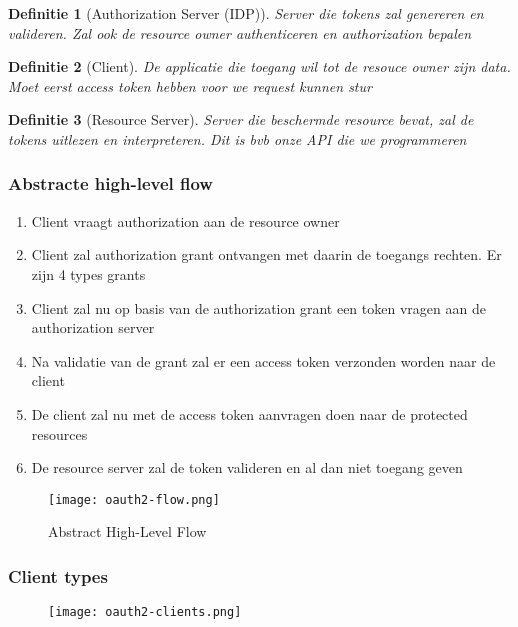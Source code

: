 \documentclass{article}
\newtheorem{theorem}{Definitie}[section]
\begin{document}
\begin{theorem}[Authorization Server (IDP)]
    Server die tokens zal genereren en valideren. Zal ook de resource owner authenticeren en authorization bepalen
\end{theorem}

\begin{theorem}[Client]
    De applicatie die toegang wil tot de resouce owner zijn data. Moet eerst access token hebben voor we request kunnen stur
\end{theorem}

\begin{theorem}[Resource Server]
    Server die beschermde resource bevat, zal de tokens uitlezen en interpreteren. Dit is bvb onze API die we programmeren
\end{theorem}

\subsubsection{Abstracte high-level flow}

\begin{enumerate}
    \item Client vraagt authorization aan de resource owner
    \item Client zal authorization grant ontvangen met daarin de toegangs rechten. Er zijn 4 types grants
    \item Client zal nu op basis van de authorization grant een token vragen aan de authorization server
    \item Na validatie van de grant zal er een access token verzonden worden naar de client
    \item De client zal nu met de access token aanvragen doen naar de protected resources
    \item De resource server zal de token valideren en al dan niet toegang geven
\end{enumerate}

\begin{figure}[H]
    \centering
    \texttt{[image: oauth2-flow.png]}
    \caption{Abstract High-Level Flow}
\end{figure}

\subsubsection{Client types}

\begin{figure}[H]
    \centering
    \texttt{[image: oauth2-clients.png]}
\end{figure}
\end{document}
